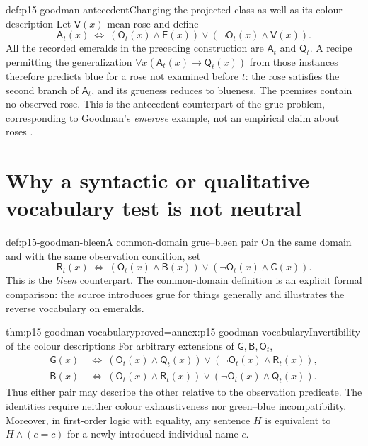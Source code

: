 \begin{hbexample}{def:p15-goodman-antecedent}{Changing the projected class as well as its colour description}
Let $\mathsf{V}(x)$ mean rose and define
\[
 \mathsf{A}_t(x)\ \Longleftrightarrow\
 (\mathsf{O}_t(x)\land\mathsf{E}(x))\lor
 (\neg\mathsf{O}_t(x)\land\mathsf{V}(x)).
\]
All the recorded emeralds in the preceding construction are
$\mathsf{A}_t$ and $\mathsf{Q}_t$. A recipe permitting the generalization
$\forall x(\mathsf{A}_t(x)\to\mathsf{Q}_t(x))$ from those instances
therefore predicts blue for a rose not examined before $t$: the rose
satisfies the second branch of $\mathsf{A}_t$, and its grueness reduces
to blueness. The premises contain no observed rose. This is the
antecedent counterpart of the grue problem, corresponding to Goodman's
\emph{emerose} example, not an empirical claim about roses
\parencite[III, \S4, n.~10]{GoodmanNewRiddleTeachingScan}.
\end{hbexample}

\section{Why a syntactic or qualitative vocabulary test is not neutral}
\label{sec:p15-goodman-language}

\begin{hbdefinition}{def:p15-goodman-bleen}{A common-domain grue--bleen pair}
On the same domain and with the same observation condition, set
\[
 \mathsf{R}_t(x)\ \Longleftrightarrow\
 (\mathsf{O}_t(x)\land\mathsf{B}(x))\lor
 (\neg\mathsf{O}_t(x)\land\mathsf{G}(x)).
\]
This is the \emph{bleen} counterpart. The common-domain definition is
an explicit formal comparison: the source introduces grue for things
generally and illustrates the reverse vocabulary on emeralds.
\end{hbdefinition}

\begin{hblemma}{thm:p15-goodman-vocabulary}{proved=annex:p15-goodman-vocabulary}{Invertibility of the colour descriptions}
For arbitrary extensions of $\mathsf{G},\mathsf{B},\mathsf{O}_t$,
\[
 \begin{split}
 \mathsf{G}(x)&\ \Longleftrightarrow\
 (\mathsf{O}_t(x)\land\mathsf{Q}_t(x))\lor
 (\neg\mathsf{O}_t(x)\land\mathsf{R}_t(x)),\\
 \mathsf{B}(x)&\ \Longleftrightarrow\
 (\mathsf{O}_t(x)\land\mathsf{R}_t(x))\lor
 (\neg\mathsf{O}_t(x)\land\mathsf{Q}_t(x)).
 \end{split}
\]
Thus either pair may describe the other relative to the observation
predicate. The identities require neither colour exhaustiveness nor
green--blue incompatibility. Moreover, in first-order logic with equality,
any sentence $H$ is equivalent to $H\land(c=c)$ for a newly introduced
individual name $c$.
\end{hblemma}

